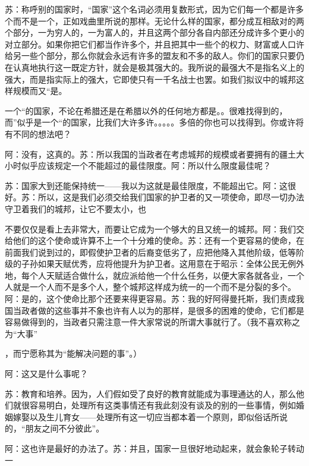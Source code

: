 \documentclass[11pt,oneside]{book}
\begin{document}
\begin{common-format}
    苏：称呼别的国家时，“国家”这个名词必须用复数形式，因为它们每一个都是许多个而不是一个，正如戏曲里所说的那样。无论什么样的国家，都分成互相敌对的两个部分，一为穷人的，一为富人的，并且这两个部分各自内部还分成许多个更小的对立部分。如果你把它们都当作许多个，并且把其中一些个的权力、财富或人口许给另一些个部分，那么你就会永远有许多的盟友和不多的敌人。你们的国家只要仍在认真地执行这一既定方针，就会是极其强大的。我所说的最强大不是指名义上的强大，而是指实际上的强大，它即使只有一千名战士也罢。如我们拟议中的城邦这样规模而又“是。

    一个“的国家，不论在希腊还是在希腊以外的任何地方都是。。很难找得到的，而”似乎是一个“的国家，比我们大许多许。。。。。多倍的你也可以找得到。你或许将有不同的想法吧？

    阿：没有，这真的。苏：所以我国的当政者在考虑城邦的规模或者要拥有的疆土大小时似乎应该规定一个不能超过的最佳限度。阿：所以什么限度最佳呢？

    苏：国家大到还能保持统一——我以为这就是最佳限度，不能超出它。阿：这很好。苏：所以，这是我们必须交给我们国家的护卫者的又一项使命，即尽一切办法守卫着我们的城邦，让它不要太小，也

    


    不要仅仅是看上去非常大，而要让它成为一个够大的且又统一的城邦。阿：我们交给他们的这个使命或许算不上一个十分难的使命。苏：还有一个更容易的使命，在前面我们说到过的，即假使护卫者的后裔变低劣了，应把他降入其他阶级，低等阶级的子孙如果天赋优秀，应将他提升为护卫者。这用意在于昭示：全体公民无例外地，每个人天赋适合做什么，就应派给他一个什么任务，以便大家各就各业，一个人就是一个人而不是多个人，整个城邦这样成为统一的一个而不是分裂的多个。阿：是的，这个使命比那个还要来得更容易。苏：我的好阿得曼托斯，我们责成我国当政者做的这些事并不象也许有人以为的那样，是很多的困难的使命，它们都是容易做得到的，当政者只需注意一件大家常说的所谓大事就行了。（我不喜欢称之为“大事”

    ，而宁愿称其为“能解决问题的事”。）

    阿：这又是什么事呢？

    苏：教育和培养。因为，人们假如受了良好的教育就能成为事理通达的人，那么他们就很容易明白，处理所有这类事情还有我此刻没有谈及的别的一些事情，例如婚姻嫁娶以及生儿育女——处理所有这一切应当都本着一个原则，即似俗话所说的，“朋友之间不分彼此”。

    阿：这也许是最好的办法了。苏：并且，国家一旦很好地动起来，就会象轮子转动一

    


\end{common-format}
\end{document}
